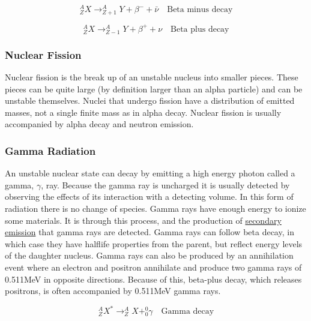 \documentclass[12pt]{article}
\begin{document}
\begin{doublespacing}
\begin{equation} \label{betaMinusDecayEqn}
^A_Z X \rightarrow ^{A}_{Z+1}Y + \beta^{-} + \bar{\nu} \quad \mbox{Beta minus decay}
\end{equation}

\begin{equation} \label{betaPlusDecayEqn}
^A_Z X \rightarrow ^{A}_{Z-1}Y + \beta^{+} + \nu \quad \mbox{Beta plus decay}
\end{equation}


\subsubsection{Nuclear Fission}
Nuclear fission is the break up of an unstable nucleus into smaller pieces. These pieces can be quite large (by definition larger than an alpha particle) and can be unstable themselves. Nuclei that undergo fission have a distribution of emitted masses, not a single finite mass as in alpha decay. Nuclear fission is usually accompanied by alpha decay and neutron emission.

\subsubsection{Gamma Radiation}
An unstable nuclear state can decay by emitting a high energy photon called a gamma, $\gamma$, ray. Because the gamma ray is uncharged it is usually detected by observing the effects of its interaction with a detecting volume. In this form of radiation there is no change of species. 
Gamma rays have enough energy to ionize some materials. It is through this process, and the production of \href{https://en.wikipedia.org/wiki/Secondary_emmission}{secondary emission} that gamma rays are detected. Gamma rays can follow beta decay, in which case they have halflife properties from the parent, but reflect energy levels of the daughter nucleus.
Gamma rays can also be produced by an annihilation event where an electron and positron annihilate and produce two gamma rays of 0.511MeV in opposite directions. Because of this, beta-plus decay, which releases positrons, is often accompanied by 0.511MeV gamma rays.

\begin{equation} \label{gammaDecayEqn}
^A_Z X^* \rightarrow ^{A}_{Z}X + ^0_0\gamma \quad \mbox{Gamma decay}
\end{equation}


\end{doublespacing}
\end{document}
